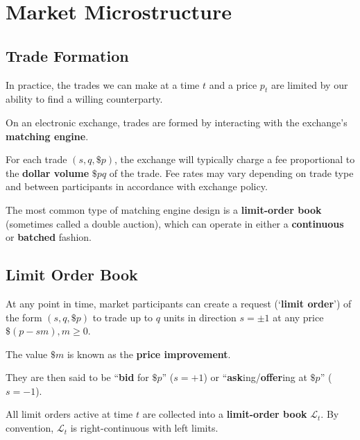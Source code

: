 \documentclass{article}
\begin{document}
\section{Market Microstructure}
\subsection{Trade Formation}
In practice, the trades we can make at a time $t$ and a price $p_t$ are limited by our ability to find a willing counterparty.

On an electronic exchange, trades are formed by interacting with the exchange's \textbf{matching engine}.%

For each trade $(s,q,\$p)$, the exchange will typically charge a fee proportional to the \textbf{dollar volume} $\$pq$ of the trade. Fee rates may vary depending on trade type and between participants in accordance with exchange policy.

The most common type of matching engine design is a \textbf{limit-order book} (sometimes called a double auction), which can operate in either a \textbf{continuous} or \textbf{batched} fashion.

\subsection{Limit Order Book}%
At any point in time, market participants can create a request (`\textbf{limit order}') of the form $(s,q,\$p)$ to trade up to $q$ units in direction $s=\pm1$ at any price $\$(p-sm), m\geq0$.%

The value $\$m$ is known as the \textbf{price improvement}. %

They are then said to be ``\textbf{bid} for $\$p$'' ($s=+1$) or ``\textbf{ask}ing/\textbf{offer}ing at $\$p$'' ($s=-1$). %

All limit orders active at time $t$ are collected into a \textbf{limit-order book} $\mathcal{L}_t$. By convention, $\mathcal{L}_t$ is right-continuous with left limits.%
\end{document}
